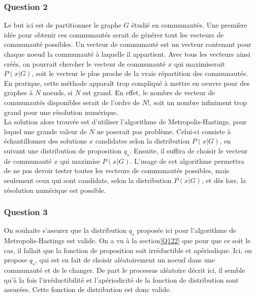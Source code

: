 \documentclass[a4paper, 11pt]{article}
\begin{document}
\begin{enumerate}
\begin{equation}
    \end{equation}
    
    \end{enumerate}
\subsubsection{Question 2}
Le but ici est de partitionner le graphe $G$ étudié en communautés. Une première idée pour obtenir ces communautés serait de générer tout les vecteurs de communauté possibles. Un vecteur de communauté est un vecteur contenant pour chaque noeud la communauté à laquelle il appartient. Avec tous les vecteurs ainsi créés, on pourrait chercher le vecteur de communauté $x$ qui maximiserait $P(x|G)$, soit le vecteur le plus proche de la vraie répartition des communautés.\\

En pratique, cette méthode apparaît trop compliqué à mettre en oeuvre pour des graphes à $N$ noeuds, si $N$ est grand. En effet, le nombre de vecteur de communautés disponibles serait de l'ordre de $N!$, soit un nombre infiniment trop grand pour une résolution numérique.\\

La solution alors trouvée est d'utiliser l'algorithme de Metropolis-Hastings, pour lequel une grande valeur de $N$ ne poserait pas problème. Celui-ci consiste à échantillonner des solutions $x$ candidates selon la distribution $P(x|G)$, en suivant une distribution de proposition $q_s$. Ensuite, il suffira de choisir le vecteur de communauté $x$ qui maximise $P(x|G)$. L'usage de cet algorithme permettra de ne pas devoir tester toutes les vecteurs de communautés possibles, mais seulement ceux qui sont candidats, selon la distribution $P(x|G)$, et dès lors, la résolution numérique est possible.
\subsubsection{Question 3}
On souhaite s'assurer que la distribution $q_s$ proposée ici pour l'algorithme de Metropolis-Hastings est valide. On a vu à la section\ref{Q122} que pour que ce soit le cas, il fallait que la fonction de proposition soit irréductible et apériodique. Ici, on propose $q_s$, qui est en fait de choisir aléatoirement un noeud dans une communauté et de le changer. De part le processus aléatoire décrit ici, il semble qu'à la fois l'irréductibilité et l'apériodicité de la fonction de distribution sont assurées. Cette fonction de distribution est donc valide. 
\end{document}
